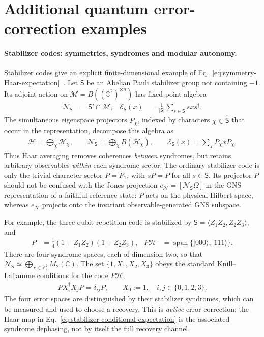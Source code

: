 \documentclass[a4paper,11pt]{article}
\theoremstyle{definition}
\newcommand{\cH}{\mathcal{H}}
\newcommand{\mN}{\mathcal{N}}
\newcommand{\mM}{\mathcal{M}}
\newcommand{\mE}{\mathcal{E}}
\begin{document}
\section{Additional quantum error-correction examples}\label{app:extra-qec-examples}

\paragraph{Stabilizer codes: symmetries, syndromes and modular autonomy.}
Stabilizer codes give an explicit finite-dimensional example of
Eq.~\eqref{eq:symmetry-Haar-expectation}~\cite{Gottesman1997,KnillLaflamme1997}.
Let $\mathsf S$ be an Abelian Pauli stabilizer group not containing $-1$.
Its adjoint action on $\mM=B((\mathbb C^2)^{\otimes n})$ has fixed-point
algebra
\begin{align}
 \mN_{\mathsf S}&=\mathsf S'\cap\mM,
 &\mE_{\mathsf S}(x)&=\frac{1}{|\mathsf S|}
                    \sum_{s\in\mathsf S}sxs^\dagger .
 \label{eq:stabilizer-conditional-expectation}
\end{align}
The simultaneous eigenspace projectors $P_\chi$, indexed by characters
$\chi\in\widehat{\mathsf S}$ that occur in the representation, decompose
this algebra as
\begin{align}
 \cH=\bigoplus_{\chi}\cH_\chi,
 \qquad
 \mN_{\mathsf S}=\bigoplus_{\chi}B(\cH_\chi),
 \qquad
 \mE_{\mathsf S}(x)=\sum_\chi P_\chi xP_\chi .
 \label{eq:stabilizer-syndrome-decomposition}
\end{align}
Thus Haar averaging removes coherences \emph{between} syndromes, but
retains arbitrary observables \emph{within} each syndrome sector. The
ordinary stabilizer code is only the trivial-character sector
$P=P_{\mathbf1}$, with $sP=P$ for all $s\in\mathsf S$. Its projector $P$
should not be confused with the Jones projection
$e_{\mN}=[\mN_{\mathsf S}\Omega]$ in the GNS representation of a faithful
reference state: $P$ acts on the physical Hilbert space, whereas $e_{\mN}$
projects onto the invariant observable-generated GNS subspace.

For example, the three-qubit repetition code is stabilized by
$\mathsf S=\langle Z_1Z_2,Z_2Z_3\rangle$, and
\begin{align}
 P&=\tfrac14(1+Z_1Z_2)(1+Z_2Z_3),
 &P\cH&=\operatorname{span}\{|000\rangle,|111\rangle\}.
 \label{eq:three-qubit-code}
\end{align}
There are four syndrome spaces, each of dimension two, so that
$\mN_{\mathsf S}\simeq\bigoplus_{\chi\in\mathbb Z_2^2}M_2(\mathbb C)$.
The set $\{1,X_1,X_2,X_3\}$ obeys the standard Knill--Laflamme
conditions for the code $P\cH$,
\begin{align}
 P X_i^\dagger X_jP=\delta_{ij}P,
 \qquad X_0:=1,
 \quad i,j\in\{0,1,2,3\} .
 \label{eq:repetition-KL}
\end{align}
The four error spaces are distinguished by their stabilizer syndromes,
which can be measured and used to choose a recovery. This is \emph{active}
error correction; the Haar map in
Eq.~\eqref{eq:stabilizer-conditional-expectation} is the associated
syndrome dephasing, not by itself the full recovery channel.
\end{document}
